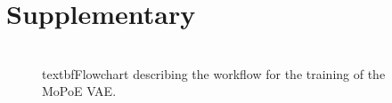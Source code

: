 \renewcommand{\thetable}{S\arabic{table}}
\setcounter{figure}{0}
\renewcommand{\thefigure}{S\arabic{figure}}

\section{Supplementary}

\begin{figure}
    \hspace*{-3.5cm}
    \label{fig:flowchart}
    \caption{\\textbf{Flowchart describing the workflow for the training of the MoPoE VAE.}}

\end{figure}
